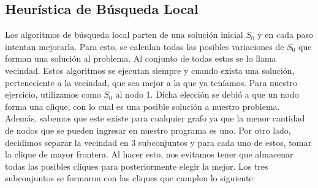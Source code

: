 \subsection{Heurística de Búsqueda Local}

Los algoritmos de búsqueda local parten de una solución inicial $S_{0}$ y en cada paso intentan mejorarla. Para esto, se calculan todas las posibles variaciones de $S_{0}$ que forman una solución al problema. Al conjunto de todas estas se lo llama vecindad. 
Estos algoritmos se ejecutan siempre y cuando exista una solución, perteneciente a la vecindad, que sea mejor a la que ya teníamos. \newline \newline
Para nuestro ejercicio, utilizamos como $S_{0}$ al nodo 1. Dicha elección se debió a que un nodo forma una clique, con lo cual es una posible solución a nuestro problema. Además, sabemos que este existe para cualquier grafo ya que la menor cantidad de nodos que se pueden ingresar en nuestro programa es uno. 
\newline Por otro lado, decidimos separar la vecindad en 3 subconjuntos y para cada uno de estos, tomar la clique de mayor frontera. Al hacer esto, nos evitamos tener que almacenar todas las posibles cliques para posteriormente elegir la mejor. Los tres subconjuntos se formaron con las cliques que cumplen lo siguiente:
